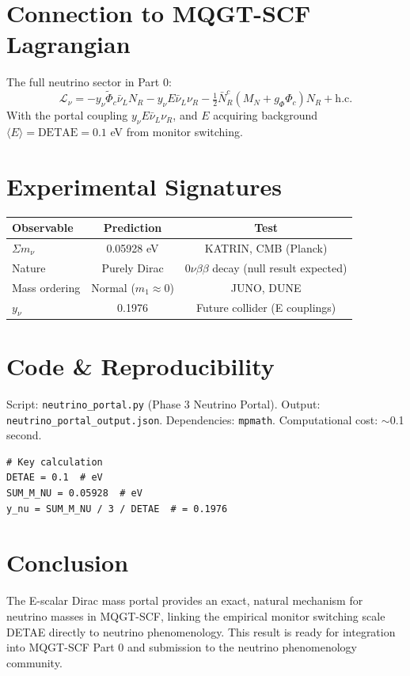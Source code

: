 \documentclass[11pt]{article}
\begin{document}
\section{Connection to MQGT-SCF Lagrangian}
The full neutrino sector in Part 0:
\begin{equation}
\mathcal{L}_\nu = -y_\nu \tilde{\Phi}_c \bar{\nu}_L N_R - y_\nu E \bar{\nu}_L \nu_R - \tfrac{1}{2} \bar{N}_R^c (M_N + g_\Phi \Phi_c) N_R + \text{h.c.}
\end{equation}
With the portal coupling $y_\nu E \bar{\nu}_L \nu_R$, and $E$ acquiring background $\langle E \rangle = \text{DETAE} = 0.1$ eV from monitor switching.

\section{Experimental Signatures}
\begin{table}[ht]
\centering
\begin{tabular}{lcc}
\toprule
Observable & Prediction & Test \\
\midrule
$\Sigma m_\nu$ & 0.05928 eV & KATRIN, CMB (Planck) \\
Nature & Purely Dirac & $0\nu\beta\beta$ decay (null result expected) \\
Mass ordering & Normal ($m_1 \approx 0$) & JUNO, DUNE \\
$y_\nu$ & 0.1976 & Future collider (E couplings) \\
\bottomrule
\end{tabular}
\end{table}

\section{Code \& Reproducibility}
Script: \texttt{neutrino\_portal.py} (Phase 3 Neutrino Portal). Output: \texttt{neutrino\_portal\_output.json}. Dependencies: \texttt{mpmath}. Computational cost: $\sim$0.1 second.

\begin{verbatim}
# Key calculation
DETAE = 0.1  # eV
SUM_M_NU = 0.05928  # eV
y_nu = SUM_M_NU / 3 / DETAE  # = 0.1976
\end{verbatim}

\section{Conclusion}
The E-scalar Dirac mass portal provides an exact, natural mechanism for neutrino masses in MQGT-SCF, linking the empirical monitor switching scale DETAE directly to neutrino phenomenology. This result is ready for integration into MQGT-SCF Part 0 and submission to the neutrino phenomenology community.



\end{document}
